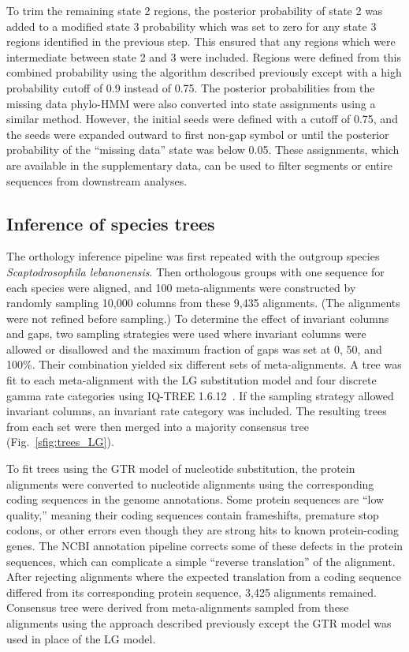 To trim the remaining state 2 regions, the posterior probability of state 2 was added to a modified state 3 probability which was set to zero for any state 3 regions identified in the previous step. This ensured that any regions which were intermediate between state 2 and 3 were included. Regions were defined from this combined probability using the algorithm described previously except with a high probability cutoff of 0.9 instead of 0.75. The posterior probabilities from the missing data phylo-HMM were also converted into state assignments using a similar method. However, the initial seeds were defined with a cutoff of 0.75, and the seeds were expanded outward to first non-gap symbol or until the posterior probability of the ``missing data'' state was below 0.05. These assignments, which are available in the supplementary data, can be used to filter segments or entire sequences from downstream analyses.

\subsection*{Inference of species trees}
The orthology inference pipeline was first repeated with the outgroup species \textit{Scaptodrosophila lebanonensis}. Then orthologous groups with one sequence for each species were aligned, and 100 meta-alignments were constructed by randomly sampling 10,000 columns from these 9,435 alignments. (The alignments were not refined before sampling.) To determine the effect of invariant columns and gaps, two sampling strategies were used where invariant columns were allowed or disallowed and the maximum fraction of gaps was set at 0, 50, and 100\%. Their combination yielded six different sets of meta-alignments. A tree was fit to each meta-alignment with the LG substitution model and four discrete gamma rate categories using IQ-TREE 1.6.12~\cite{Nguyen2014, Le2008, Yang1994}. If the sampling strategy allowed invariant columns, an invariant rate category was included. The resulting trees from each set were then merged into a majority consensus tree (Fig.~\ref{sfig:trees_LG}).

To fit trees using the GTR model of nucleotide substitution, the protein alignments were converted to nucleotide alignments using the corresponding coding sequences in the genome annotations. Some protein sequences are ``low quality,'' meaning their coding sequences contain frameshifts, premature stop codons, or other errors even though they are strong hits to known protein-coding genes. The NCBI annotation pipeline corrects some of these defects in the protein sequences, which can complicate a simple ``reverse translation'' of the alignment. After rejecting alignments where the expected translation from a coding sequence differed from its corresponding protein sequence, 3,425 alignments remained. Consensus tree were derived from meta-alignments sampled from these alignments using the approach described previously except the GTR model was used in place of the LG model.

